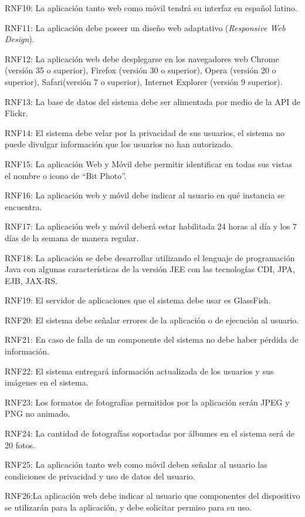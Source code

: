 \documentclass{memoria}
\begin{document}
RNF10: La aplicación tanto web como móvil tendrá su interfaz en español latino.

RNF11: La aplicación debe poseer un diseño web adaptativo (\textsl{Responsive Web Design}).

RNF12: La aplicación web debe desplegarse en los navegadores web Chrome (versión 35 o superior), Firefox (versión 30 o superior), Opera (versión 20 o superior), Safari(versión 7 o superior), Internet Explorer (versión 9 superior).

RNF13: La base de datos del sistema debe ser alimentada por medio de la API de Flickr.

RNF14: El sistema debe velar por la privacidad de sus usuarios, el sistema no puede divulgar información que los usuarios no han autorizado.

RNF15: La aplicación Web y Móvil debe permitir identificar en todas sus vistas el nombre o icono de “Bit Photo”.

RNF16: La aplicación web y móvil debe indicar al usuario en qué instancia se encuentra.

RNF17: La aplicación web y móvil deberá estar habilitada 24 horas al día y los 7 días de la semana de manera regular.

RNF18: La aplicación se debe desarrollar utilizando el lenguaje de programación Java con algunas características de la versión JEE con las tecnologías CDI, JPA, EJB, JAX-RS.

RNF19: El servidor de aplicaciones que el sistema debe usar es GlassFish.

RNF20: El sistema debe señalar errores de la aplicación o de ejecución al usuario.

RNF21: En caso de falla de un componente del sistema no debe haber pérdida de información.

RNF22: El sistema entregará información actualizada de los usuarios y sus imágenes en  el sistema.

RNF23: Los formatos de fotografías permitidos por la aplicación serán JPEG y PNG no animado.

RNF24: La cantidad de fotografías soportadas por álbumes en el sistema será de 20 fotos.

RNF25: La aplicación tanto web como móvil deben señalar al usuario las condiciones de privacidad y uso de datos del usuario.

RNF26:La aplicación web debe indicar al usuario que componentes del dispositivo se utilizarán para la aplicación, y debe solicitar permiso para su uso.
\end{document}
